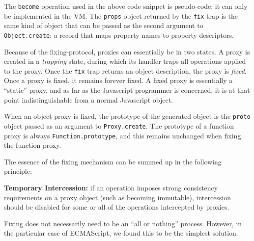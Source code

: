\documentclass{sig-alternate}
\begin{document}
The \texttt{become} operation used in the above code snippet is pseudo-code: it can only be implemented in the VM. The \texttt{props} object returned by the \texttt{fix} trap is the same kind of object that can be passed as the second argument to \texttt{Object.create}: a record that maps property names to property descriptors.

Because of the fixing-protocol, proxies can essentially be in two states. A proxy is created in a \emph{trapping} state, during which its handler traps all operations applied to the proxy. Once the \texttt{fix} trap returns an object description, the proxy is \emph{fixed}. Once a proxy is fixed, it remains forever fixed. A fixed proxy is essentially a ``static'' proxy, and as far as the Javascript programmer is concerned, it is at that point indistinguishable from a normal Javascript object.

When an object proxy is fixed, the prototype of the generated object is the \texttt{proto} object passed as an argument to \texttt{Proxy.create}. The prototype of a function proxy is always \texttt{Function.prototype}, and this remains unchanged when fixing the function proxy.

The essence of the fixing mechanism can be summed up in the following principle:

\textbf{Temporary Intercession:} if an operation imposes strong consistency requirements on a proxy object (such as becoming immutable), intercession should be disabled for some or all of the operations intercepted by proxies.

Fixing does not necessarily need to be an ``all or nothing'' process. However, in the particular case of ECMAScript, we found this to be the simplest solution.


%
%
%
\end{document}
